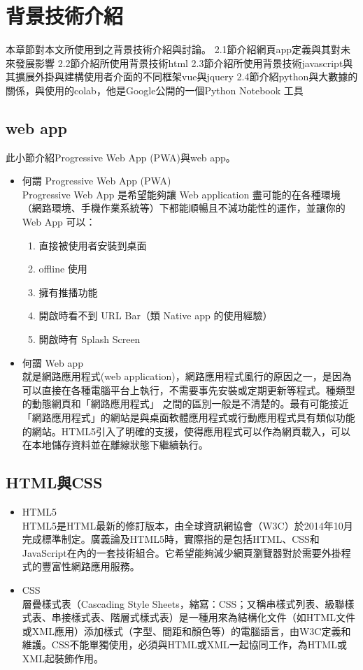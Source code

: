 \chapter{背景技術介紹}
\label{c:intro}
本章節對本文所使用到之背景技術介紹與討論。
2.1節介紹網頁app定義與其對未來發展影響
2.2節介紹所使用背景技術html
2.3節介紹所使用背景技術javascript與其擴展外掛與建構使用者介面的不同框架vue與jquery
2.4節介紹python與大數據的關係，與使用的colab，他是Google公開的一個Python Notebook 工具 
\section{web app} 
此小節介紹Progressive Web App (PWA)與web app。
\begin{itemize}
	\item 何謂 Progressive Web App (PWA)\\
	Progressive Web App 是希望能夠讓 Web application 盡可能的在各種環境（網路環境、手機作業系統等）下都能順暢且不減功能性的運作，並讓你的 Web App 可以：
	\begin{enumerate}[1.]
		\item 直接被使用者安裝到桌面
		\item offline 使用
		\item 擁有推播功能
		\item 開啟時看不到 URL Bar（類 Native app 的使用經驗）
		\item 開啟時有 Splash Screen \cite{name7}
	\end{enumerate}
	\item 何謂 Web app\\
	就是網路應用程式(web application)，網路應用程式風行的原因之一，是因為可以直接在各種電腦平台上執行，不需要事先安裝或定期更新等程式。種類型的動態網頁和「網路應用程式」 之間的區別一般是不清楚的。最有可能接近「網路應用程式」的網站是與桌面軟體應用程式或行動應用程式具有類似功能的網站。HTML5引入了明確的支援，使得應用程式可以作為網頁載入，可以在本地儲存資料並在離線狀態下繼續執行。\cite{name8}
\end{itemize}

\section{HTML與CSS}
\begin{itemize}
\item HTML5\\
HTML5是HTML最新的修訂版本，由全球資訊網協會（W3C）於2014年10月完成標準制定。廣義論及HTML5時，實際指的是包括HTML、CSS和JavaScript在內的一套技術組合。它希望能夠減少網頁瀏覽器對於需要外掛程式的豐富性網路應用服務。\cite{name9}
\item CSS\\
層疊樣式表（Cascading Style Sheets，縮寫：CSS；又稱串樣式列表、級聯樣式表、串接樣式表、階層式樣式表）是一種用來為結構化文件（如HTML文件或XML應用）添加樣式（字型、間距和顏色等）的電腦語言，由W3C定義和維護。CSS不能單獨使用，必須與HTML或XML一起協同工作，為HTML或XML起裝飾作用。\cite{name10}
\end{itemize}

